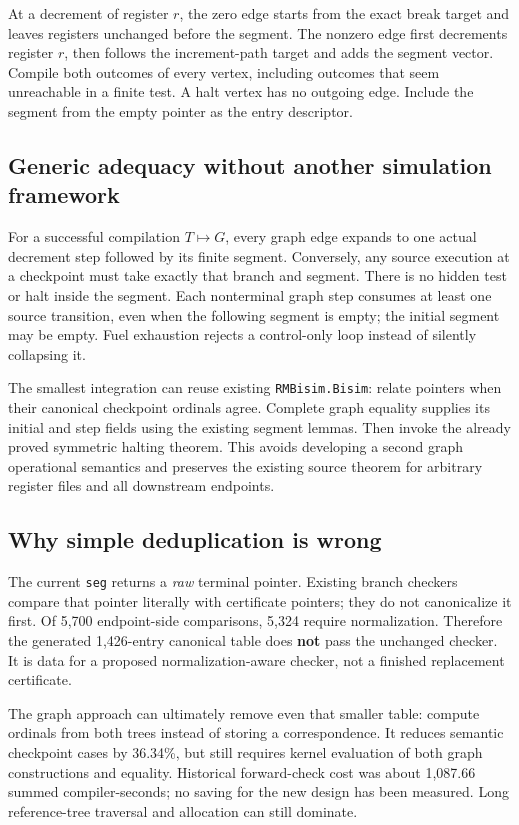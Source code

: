 \documentclass[11pt]{article}
\begin{document}
At a decrement of register $r$, the zero edge starts from the exact break target and leaves registers unchanged before the segment. The nonzero edge first decrements register $r$, then follows the increment-path target and adds the segment vector. Compile both outcomes of every vertex, including outcomes that seem unreachable in a finite test. A halt vertex has no outgoing edge. Include the segment from the empty pointer as the entry descriptor.

\subsection{Generic adequacy without another simulation framework}
For a successful compilation $T\mapsto G$, every graph edge expands to one actual decrement step followed by its finite segment. Conversely, any source execution at a checkpoint must take exactly that branch and segment. There is no hidden test or halt inside the segment. Each nonterminal graph step consumes at least one source transition, even when the following segment is empty; the initial segment may be empty. Fuel exhaustion rejects a control-only loop instead of silently collapsing it.

The smallest integration can reuse existing \texttt{RMBisim.Bisim}: relate pointers when their canonical checkpoint ordinals agree. Complete graph equality supplies its initial and step fields using the existing segment lemmas. Then invoke the already proved symmetric halting theorem. This avoids developing a second graph operational semantics and preserves the existing source theorem for arbitrary register files and all downstream endpoints.

\subsection{Why simple deduplication is wrong}
The current \texttt{seg} returns a \emph{raw} terminal pointer. Existing branch checkers compare that pointer literally with certificate pointers; they do not canonicalize it first. Of 5,700 endpoint-side comparisons, 5,324 require normalization. Therefore the generated 1,426-entry canonical table does \textbf{not} pass the unchanged checker. It is data for a proposed normalization-aware checker, not a finished replacement certificate.

The graph approach can ultimately remove even that smaller table: compute ordinals from both trees instead of storing a correspondence. It reduces semantic checkpoint cases by 36.34\%, but still requires kernel evaluation of both graph constructions and equality. Historical forward-check cost was about 1,087.66 summed compiler-seconds; no saving for the new design has been measured. Long reference-tree traversal and allocation can still dominate.
\end{document}

